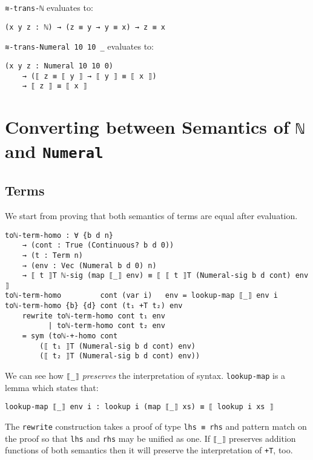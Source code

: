 \documentclass[\main/thesis.tex]{subfiles}
\begin{document}
\lstinline|≋-trans-ℕ| evaluates to:

\begin{lstlisting}
(x y z : ℕ) → (z ≡ y → y ≡ x) → z ≡ x
\end{lstlisting}

\lstinline|≋-trans-Numeral 10 10 _| evaluates to:

\begin{lstlisting}
(x y z : Numeral 10 10 0)
    → (⟦ z ≡ ⟦ y ⟧ → ⟦ y ⟧ ≡ ⟦ x ⟧)
    → ⟦ z ⟧ ≡ ⟦ x ⟧
\end{lstlisting}

\section{Converting between Semantics of \lstinline|ℕ| and \lstinline|Numeral|}


\subsection{Terms}

We start from proving that both semantics of terms are equal after evaluation.

\begin{lstlisting}[basicstyle=\ttfamily\scriptsize]
toℕ-term-homo : ∀ {b d n}
    → (cont : True (Continuous? b d 0))
    → (t : Term n)
    → (env : Vec (Numeral b d 0) n)
    → ⟦ t ⟧T ℕ-sig (map ⟦_⟧ env) ≡ ⟦ ⟦ t ⟧T (Numeral-sig b d cont) env ⟧
toℕ-term-homo         cont (var i)   env = lookup-map ⟦_⟧ env i
toℕ-term-homo {b} {d} cont (t₁ +T t₂) env
    rewrite toℕ-term-homo cont t₁ env
          | toℕ-term-homo cont t₂ env
    = sym (toℕ-+-homo cont
        (⟦ t₁ ⟧T (Numeral-sig b d cont) env)
        (⟦ t₂ ⟧T (Numeral-sig b d cont) env))
\end{lstlisting}

We can see how \lstinline|⟦_⟧| \textit{preserves} the interpretation of syntax.
\lstinline|lookup-map| is a lemma which states that:

\begin{lstlisting}[basicstyle=\ttfamily\scriptsize]
lookup-map ⟦_⟧ env i : lookup i (map ⟦_⟧ xs) ≡ ⟦ lookup i xs ⟧
\end{lstlisting}

The \lstinline|rewrite| construction takes a proof of type \lstinline|lhs ≡ rhs|
and pattern match on the proof so that \lstinline|lhs| and \lstinline|rhs| may
be unified as one.
If \lstinline|⟦_⟧| preserves addition functions of both semantics
then it will preserve the interpretation of \lstinline|+T|, too.
\end{document}
